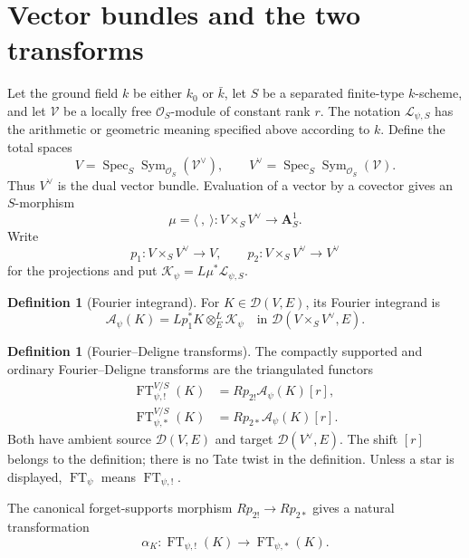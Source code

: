 \documentclass[10pt]{article}
\theoremstyle{definition}
\newtheorem{definition}[theorem]{Definition}
\newcommand{\Aone}{\mathbf A^1}
\newcommand{\Db}{\mathcal D}
\newcommand{\FT}{\operatorname{FT}}
\newcommand{\Spec}{\operatorname{Spec}}
\begin{document}
\section{Vector bundles and the two transforms}

Let the ground field \(k\) be either \(k_0\) or \(\bar k\), let \(S\) be a
separated finite-type \(k\)-scheme, and let \(\mathcal V\) be a locally free
\(\mathcal O_S\)-module of constant rank \(r\).  The notation
\(\mathcal L_{\psi,S}\) has the arithmetic or geometric meaning specified
above according to \(k\).  Define the total spaces
\[
 V=\Spec_S\operatorname{Sym}_{\mathcal O_S}(\mathcal V^\vee),
 \qquad
 V^\vee=\Spec_S\operatorname{Sym}_{\mathcal O_S}(\mathcal V).
\]
Thus \(V^\vee\) is the dual vector bundle.  Evaluation of a vector by a
covector gives an \(S\)-morphism
\[
 \mu=\langle\ ,\ \rangle:V\times_SV^\vee\longrightarrow\Aone_S.
\]
Write
\[
 p_1:V\times_SV^\vee\longrightarrow V,
 \qquad
 p_2:V\times_SV^\vee\longrightarrow V^\vee
\]
for the projections and put
\(\mathcal K_\psi=L\mu^*\mathcal L_{\psi,S}\).

\begin{definition}[Fourier integrand]
For \(K\in\Db(V,E)\), its Fourier integrand is
\[
 \mathcal A_\psi(K)
 =Lp_1^*K\otimes_E^L\mathcal K_\psi
 \quad\text{in }\Db(V\times_SV^\vee,E).
\]
\end{definition}

\begin{definition}[Fourier--Deligne transforms]
The compactly supported and ordinary Fourier--Deligne transforms are the
triangulated functors
\[
 \begin{aligned}
 \FT^{V/S}_{\psi,!}(K)
   &=Rp_{2!}\mathcal A_\psi(K)[r],\\
 \FT^{V/S}_{\psi,*}(K)
   &=Rp_{2*}\mathcal A_\psi(K)[r].
 \end{aligned}
\]
Both have ambient source \(\Db(V,E)\) and target \(\Db(V^\vee,E)\).  The
shift \([r]\) belongs to the definition; there is no Tate twist in the
definition.  Unless a star is displayed, \(\FT_\psi\) means
\(\FT_{\psi,!}\).
\end{definition}

The canonical forget-supports morphism \(Rp_{2!}\to Rp_{2*}\) gives a
natural transformation
\[
 \alpha_K:\FT_{\psi,!}(K)\longrightarrow\FT_{\psi,*}(K).
\]
\end{document}
